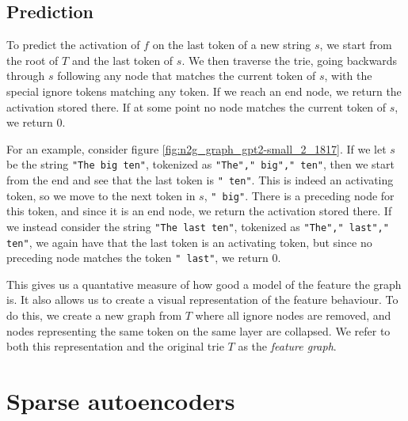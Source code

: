 \subsection{Prediction}
To predict the activation of $f$ on the last token of a new string $s$, 
we start from the root of $T$ and the last token of $s$.
We then traverse the trie, going backwards through $s$ 
following any node that matches the current token of $s$, 
with the special ignore tokens matching any token.
If we reach an end node, we return the activation stored there.
If at some point no node matches the current token of $s$, 
we return $0$.

For an example, consider figure \ref{fig:n2g_graph_gpt2-small_2_1817}.
If we let $s$ be the string \texttt{"The big ten"}, tokenized as \texttt{"The"," big"," ten"}, then we start from the end and see that the last token is \texttt{" ten"}.
This is indeed an activating token, so we move to the next token in $s$, \texttt{" big"}.
There is a preceding node for this token, and since it is an end node, we return the activation stored there.
If we instead consider the string \texttt{"The last ten"}, tokenized as \texttt{"The"," last"," ten"}, we again have that the last token is an activating token, but since no preceding node matches the token \texttt{" last"}, we return $0$.

This gives us a quantative measure of how good a model of the feature 
the graph is.
It also allows us to create a visual representation 
of the feature behaviour.
To do this, we create a new graph from $T$ 
where all ignore nodes are removed, 
and nodes representing the same token on the same layer are collapsed.
We refer to both this representation and the original trie $T$ 
as the \emph{feature graph}.


\section{Sparse autoencoders}
\label{sec:sae}
